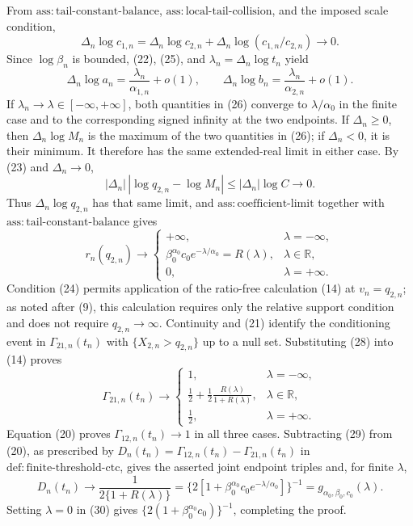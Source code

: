 From \(\mathrm{ass{:}tail\text{-}constant\text{-}balance}\), \(\mathrm{ass{:}local\text{-}tail\text{-}collision}\), and the imposed scale condition,
\[
\Delta_n\log c_{1,n}
=\Delta_n\log c_{2,n}
+\Delta_n\log(c_{1,n}/c_{2,n})\to0.
\tag{25}
\]
Since \(\log\beta_n\) is bounded, (22), (25), and \(\lambda_n=\Delta_n\log t_n\) yield
\[
\Delta_n\log a_n=\frac{\lambda_n}{\alpha_{1,n}}+o(1),
\qquad
\Delta_n\log b_n=\frac{\lambda_n}{\alpha_{2,n}}+o(1).
\tag{26}
\]
If \(\lambda_n\to\lambda\in[-\infty,+\infty]\), both quantities in (26) converge to \(\lambda/\alpha_0\) in the finite case and to the corresponding signed infinity at the two endpoints. If \(\Delta_n\geq0\), then \(\Delta_n\log M_n\) is the maximum of the two quantities in (26); if \(\Delta_n<0\), it is their minimum. It therefore has the same extended-real limit in either case. By (23) and \(\Delta_n\to0\),
\[
|\Delta_n|\,|\log q_{2,n}-\log M_n|
\leq|\Delta_n|\log C\to0.
\tag{27}
\]
Thus \(\Delta_n\log q_{2,n}\) has that same limit, and \(\mathrm{ass{:}coefficient\text{-}limit}\) together with \(\mathrm{ass{:}tail\text{-}constant\text{-}balance}\) gives
\[
r_n(q_{2,n})\longrightarrow
\begin{cases}
+\infty, & \lambda=-\infty,\\
\beta_0^{\alpha_0}c_0e^{-\lambda/\alpha_0}=R(\lambda), & \lambda\in\mathbb R,\\
0, & \lambda=+\infty.
\end{cases}
\tag{28}
\]
Condition (24) permits application of the ratio-free calculation (14) at \(v_n=q_{2,n}\); as noted after (9), this calculation requires only the relative support condition and does not require \(q_{2,n}\to\infty\). Continuity and (21) identify the conditioning event in \(\Gamma_{21,n}(t_n)\) with \(\{X_{2,n}>q_{2,n}\}\) up to a null set. Substituting (28) into (14) proves
\[
\Gamma_{21,n}(t_n)\longrightarrow
\begin{cases}
1, & \lambda=-\infty,\\
\displaystyle\frac12+\frac12\frac{R(\lambda)}{1+R(\lambda)}, & \lambda\in\mathbb R,\\
\frac12, & \lambda=+\infty.
\end{cases}
\tag{29}
\]
Equation (20) proves \(\Gamma_{12,n}(t_n)\to1\) in all three cases. Subtracting (29) from (20), as prescribed by \(D_n(t_n)=\Gamma_{12,n}(t_n)-\Gamma_{21,n}(t_n)\) in \(\mathrm{def{:}finite\text{-}threshold\text{-}ctc}\), gives the asserted joint endpoint triples and, for finite \(\lambda\),
\[
D_n(t_n)\to\frac1{2\{1+R(\lambda)\}}
=\{2[1+\beta_0^{\alpha_0}c_0e^{-\lambda/\alpha_0}]\}^{-1}
=g_{\alpha_0,\beta_0,c_0}(\lambda).
\tag{30}
\]
Setting \(\lambda=0\) in (30) gives \(\{2(1+\beta_0^{\alpha_0}c_0)\}^{-1}\), completing the proof.